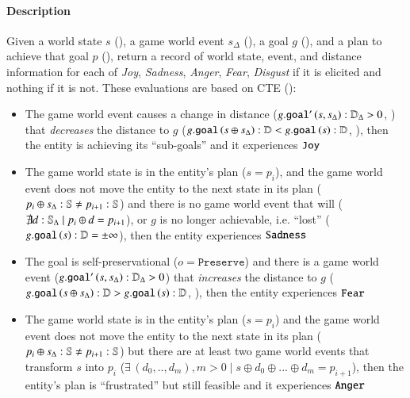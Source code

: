 \paragraph{Description} Given a world state $s$ (), a
game world event $s_\Delta$ (), a goal $g$
(), and a plan to achieve that goal $p$ (),
return a record of world state, event, and distance information for each of
\textit{Joy}, \textit{Sadness}, \textit{Anger}, \textit{Fear}, \textit{Disgust}
if it is elicited and nothing if it is not. These evaluations are based on CTE
():
\begin{itemize}
    \item The game world event causes a change in distance
    ($g.\mathtt{goal'}\left(s, s_\Delta\right) : \mathbb{D}_{\Delta} > 0$,
    ) that \textit{decreases} the
    distance to $g$ ($g.\mathtt{goal}\left(s \oplus s_\Delta\right) :
    \mathbb{D} < g.\mathtt{goal}\left(s\right) : \mathbb{D}$,
    ), then the entity is achieving its
    ``sub-goals'' and it experiences $\mathtt{Joy}$

    \item The game world state is in the entity's plan ($s = p_i$), and the
    game world event does not move the entity to the next state in its plan
    ($p_i \oplus s_\Delta : \mathbb{S} \neq p_{i+1} : \mathbb{S}$)
    and there is no game world event that will ($\nexists d :
    \mathbb{S}_{\Delta} \; | \; p_i \oplus d = p_{i+1}$), or $g$ is no longer
    achievable, i.e. ``lost'' ($g.\mathtt{goal}\left(s\right) :
    \mathbb{D} = \pm\infty$), then the entity experiences $\mathtt{Sadness}$

    \item The goal is self-preservational ($o = \mathtt{Preserve}$) and there
    is a game world event ($g.\mathtt{goal'}\left(s, s_\Delta\right) :
    \mathbb{D}_{\Delta} > 0$) that \textit{increases} the distance to $g$
    ($g.\mathtt{goal}\left(s \oplus s_\Delta\right) : \mathbb{D} >
    g.\mathtt{goal}\left(s\right) : \mathbb{D}$,
    ), then the entity experiences $\mathtt{Fear}$

    \item The game world state is in the entity's plan ($s = p_i$) and the game
    world event does not move the entity to the next state in its plan ($p_i
    \oplus s_\Delta : \mathbb{S} \neq p_{i+1} : \mathbb{S}$) but
    there are at least two game world events that transform $s$ into $p_i$
    ($\exists \, (d_0, .., d_m), m > 0 \; | \; s \oplus d_0 \oplus ... \oplus
    d_m = p_{i+1}$), then the entity's plan is ``frustrated'' but still
    feasible and it experiences $\mathtt{Anger}$


\end{itemize}
